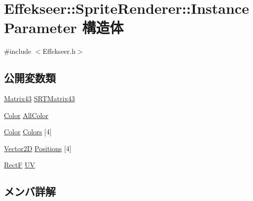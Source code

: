 \hypertarget{struct_effekseer_1_1_sprite_renderer_1_1_instance_parameter}{}\section{Effekseer\+:\+:Sprite\+Renderer\+:\+:Instance\+Parameter 構造体}
\label{struct_effekseer_1_1_sprite_renderer_1_1_instance_parameter}


{\ttfamily \#include $<$Effekseer.\+h$>$}

\subsection*{公開変数類}
\begin{DoxyCompactItemize}
\item 
\mbox{\hyperlink{struct_effekseer_1_1_matrix43}{Matrix43}} \mbox{\hyperlink{struct_effekseer_1_1_sprite_renderer_1_1_instance_parameter_ac25f3a2b7f290ac99b8c50b0eaf92339}{S\+R\+T\+Matrix43}}
\item 
\mbox{\hyperlink{struct_effekseer_1_1_color}{Color}} \mbox{\hyperlink{struct_effekseer_1_1_sprite_renderer_1_1_instance_parameter_a7160592889f3f59c114094b3cc8f9cd5}{All\+Color}}
\item 
\mbox{\hyperlink{struct_effekseer_1_1_color}{Color}} \mbox{\hyperlink{struct_effekseer_1_1_sprite_renderer_1_1_instance_parameter_ae745017c89a18992eecfcc14c4f5f763}{Colors}} \mbox{[}4\mbox{]}
\item 
\mbox{\hyperlink{struct_effekseer_1_1_vector2_d}{Vector2D}} \mbox{\hyperlink{struct_effekseer_1_1_sprite_renderer_1_1_instance_parameter_a6182e946041958ddc8e63b59165a9249}{Positions}} \mbox{[}4\mbox{]}
\item 
\mbox{\hyperlink{struct_effekseer_1_1_rect_f}{RectF}} \mbox{\hyperlink{struct_effekseer_1_1_sprite_renderer_1_1_instance_parameter_aedec84f7ebb3f45f2a8057990f3907ba}{UV}}
\end{DoxyCompactItemize}


\subsection{メンバ詳解}
\mbox{\label{struct_effekseer_1_1_sprite_renderer_1_1_instance_parameter_a7160592889f3f59c114094b3cc8f9cd5}} 
